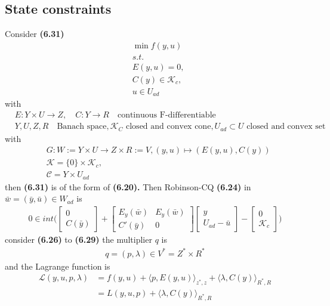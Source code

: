 \documentclass[a4paper,11pt,fleqn]{book}
\theoremstyle{definition}
\theoremstyle{remark}
\begin{document}
\subsection{State constraints}
Consider \textbf{(6.31)}
\begin{align*}
	&\min f(y, u) \\
	&s.t.\\
	&E(y, u) = 0,\\
	&C(y) \in \mathcal{K}_c,\\
	&u \in U_{ad}
\end{align*}
with
\begin{align*}
	&E: Y \times U \rightarrow Z,\quad C:Y \rightarrow R \quad \text{continuous F-differentiable}\\
	&Y, U, Z, R \quad \text{Banach space}, \mathcal{K}_C \text{ closed and convex cone}, U_{ad} \subset U \text{ closed and convex set}
\end{align*}
with 
\begin{align*}
	&G:  W := Y \times U \rightarrow  Z \times R := V,
	(y, u) \mapsto (E(y, u), C(y))\\
	&\mathcal{K} = \{0\} \times \mathcal{K}_c,\\
	&\mathcal{C} = Y \times U_{ad}
\end{align*}
then \textbf{(6.31)} is of the form of \textbf{(6.20).} Then Robinson-CQ \textbf{(6.24)} in $\bar{w} = (\bar{y}, \bar{u}) \in W_{ad}$ is 
\begin{align*}
	0 \in int\bigg( 
	\begin{bmatrix}
		0\\
		C(\bar{y})
	\end{bmatrix}
	+ 
	\begin{bmatrix}
		E_y (\bar{w}) & E_y(\bar{w})\\
		C'(\bar{y}) & 0
	\end{bmatrix}
	\begin{bmatrix}
		y\\
		U_{ad} - \bar{u}
	\end{bmatrix}
	 - 
	 \begin{bmatrix}
	 	0\\
	 	\mathcal{K}_c
	 \end{bmatrix} \bigg)
\end{align*}
consider \textbf{(6.26)} to \textbf{(6.29)} the multiplier $q$ is 
\begin{align*}
	q = (p, \lambda) \in V^* = Z^* \times R^*
\end{align*}
and the Lagrange function is 
\begin{align*}
	\mathcal{L}(y, u, p, \lambda) &= f(y, u) + \langle p, E(y, u) \rangle_{z^*, z} + \langle \lambda, C(y) \rangle_{R^*, R}\\
	&= L(y, u, p) + \langle \lambda, C(y) \rangle_{R^*, R}
\end{align*}
\end{document}
